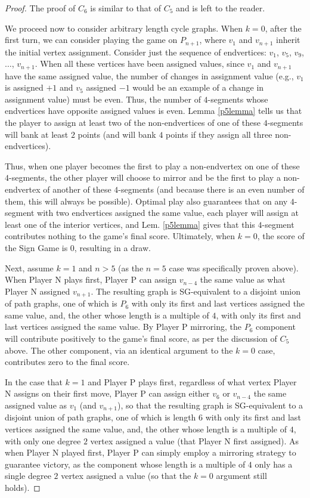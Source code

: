 \documentclass[amsart,11pt]{article}
\theoremstyle{dotless}
\theoremstyle{dotless}
\begin{document}
\begin{proof}
The proof of $C_6$ is similar to that of $C_5$ and is left to the reader.

We proceed now to consider arbitrary length cycle graphs. When $k = 0$, after the first turn, we can consider playing the game on $P_{n+1}$, where $v_1$ and $v_{n+1}$ inherit the initial vertex assignment. Consider just the sequence of endvertices: $v_1$, $v_5$, $v_9$, $\ldots$, $v_{n+1}$. When all these vertices have been assigned values, since $v_1$ and $v_{n+1}$ have the same assigned value, the number of changes in assignment value (e.g., $v_1$ is assigned $+1$ and $v_5$ assigned $-1$ would be an example of a change in assignment value) must be even. Thus, the number of $4$-segments whose endvertices have opposite assigned values is even. Lemma \ref{p5lemma} tells us that the player to assign at least two of the non-endvertices of one of these $4$-segments will bank at least $2$ points (and will bank $4$ points if they assign all three non-endvertices). 

Thus, when one player becomes the first to play a non-endvertex on one of these $4$-segments, the other player will choose to mirror and be the first to play a non-endvertex of another of these $4$-segments (and because there is an even number of them, this will always be possible). Optimal play also guarantees that on any $4$-segment with two endvertices assigned the same value, each player will assign at least one of the interior vertices, and Lem. \ref{p5lemma} gives that this $4$-segment contributes nothing to the game's final score. Ultimately, when $k =0$, the score of the Sign Game is $0$, resulting in a draw.

Next, assume $k = 1$ and $n > 5$ (as the $n = 5$ case was specifically proven above). When Player N plays first, Player P can assign $v_{n-4}$ the same value as what Player N assigned $v_{n+1}$. The resulting graph is SG-equivalent to a disjoint union of path graphs, one of which is $P_6$ with only its first and last vertices assigned the same value, and, the other whose length is a multiple of $4$, with only its first and last vertices assigned the same value. By Player P mirroring, the $P_6$ component will contribute positively to the game's final score, as per the discussion of $C_5$ above. The other component, via an identical argument to the $k=0$ case, contributes zero to the final score.

In the case that $k = 1$ and Player P plays first, regardless of what vertex Player N assigns on their first move, Player P can assign either $v_6$ or $v_{n-4}$ the same assigned value as $v_1$ (and $v_{n+1}$), so that the resulting graph is SG-equivalent to a disjoint union of path graphs, one of which is length $6$ with only its first and last vertices assigned the same value, and, the other whose length is a multiple of $4$, with only one degree $2$ vertex assigned a value (that Player N first assigned). As when Player N played first, Player P can simply employ a mirroring strategy to guarantee victory, as the component whose length is a multiple of $4$ only has a single degree $2$ vertex assigned a value (so that the $k=0$ argument still holds).



\end{proof}
\end{document}
